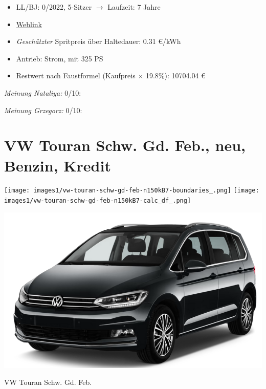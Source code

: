 \documentclass[landscape, DIV=99, 14pt]{scrartcl}
\begin{document}
\begin{itemize}
    \item LL/BJ: 0/2022, 5-Sitzer $\rightarrow$ Laufzeit: 7 Jahre
    \item \href{https://www.tesla.com/de_de/model3/design\#overview}{Weblink}
    \item \emph{Gesch\"atzter} Spritpreis \"uber Haltedauer: 0.31 \euro{}/kWh
    \item Antrieb: Strom, mit 325 PS
    \item Restwert nach Faustformel (Kaufpreis $\times$ 19.8\%): 10704.04 \euro{}
\end{itemize}

\begin{small}
\emph{Meinung Nataliya:} 0/10: 
        
\emph{Meinung Grzegorz:} 0/10: 
\end{small}

\pagebreak


\twocolumn

\section*{VW Touran Schw. Gd. Feb., neu, Benzin, Kredit}
\begin{center}
\texttt{[image: images1/vw-touran-schw-gd-feb-n150kB7-boundaries\_.png]}
\null
\vspace{0.5cm}
\texttt{[image: images1/vw-touran-schw-gd-feb-n150kB7-calc\_df\_.png]}
\end{center}

\pagebreak
\begin{center}
\includegraphics[width=0.9\columnwidth]{cars/vw-touran.png}

VW Touran Schw. Gd. Feb.
\end{center}
\end{document}
